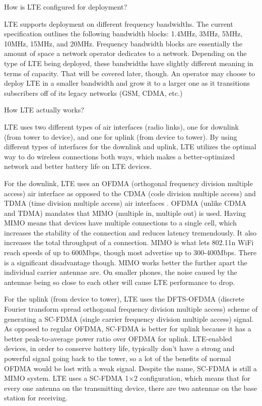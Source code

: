 How is LTE configured for deployment?

LTE supports deployment on different frequency bandwidths. The current specification outlines the following bandwidth blocks: 1.4MHz, 3MHz, 5MHz, 10MHz, 15MHz, and 20MHz. Frequency bandwidth blocks are essentially the amount of space a network operator dedicates to a network. Depending on the type of LTE being deployed, these bandwidths have slightly different meaning in terms of capacity. That will be covered later, though. An operator may choose to deploy LTE in a smaller bandwidth and grow it to a larger one as it transitions subscribers off of its legacy networks (GSM, CDMA, etc.)

How LTE actually works?

LTE uses two different types of air interfaces (radio links), one for downlink (from tower to device), and one for uplink (from device to tower). By using different types of interfaces for the downlink and uplink, LTE utilizes the optimal way to do wireless connections both ways, which makes a better-optimized network and better battery life on LTE devices.

For the downlink, LTE uses an OFDMA (orthogonal frequency division multiple access) air interface as opposed to the CDMA (code division multiple access) and TDMA (time division multiple access) air interfaces . OFDMA (unlike CDMA and TDMA) mandates that MIMO (multiple in, multiple out) is used. Having MIMO means that devices have multiple connections to a single cell, which increases the stability of the connection and reduces latency tremendously. It also increases the total throughput of a connection. MIMO is what lets 802.11n WiFi reach speeds of up to 600Mbps, though most advertise up to 300-400Mbps. There is a significant disadvantage though. MIMO works better the further apart the individual carrier antennae are. On smaller phones, the noise caused by the antennae being so close to each other will cause LTE performance to drop. 

For the uplink (from device to tower), LTE uses the DFTS-OFDMA (discrete Fourier transform spread orthogonal frequency division multiple access) scheme of generating a SC-FDMA (single carrier frequency division multiple access) signal. As opposed to regular OFDMA, SC-FDMA is better for uplink because it has a better peak-to-average power ratio over OFDMA for uplink. LTE-enabled devices, in order to conserve battery life, typically don’t have a strong and powerful signal going back to the tower, so a lot of the benefits of normal OFDMA would be lost with a weak signal. Despite the name, SC-FDMA is still a MIMO system. LTE uses a SC-FDMA 1×2 configuration, which means that for every one antenna on the transmitting device, there are two antennae on the base station for receiving.

